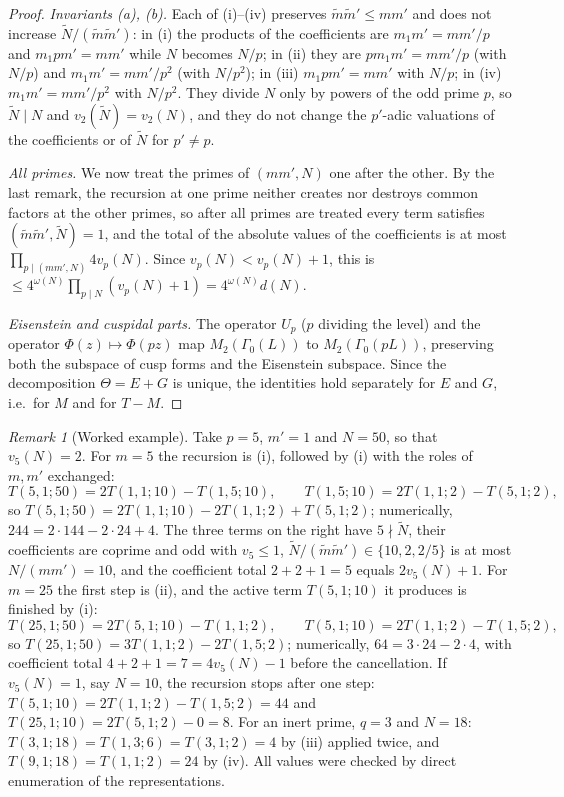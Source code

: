 \documentclass[11pt]{amsart}
\theoremstyle{remark}
\newtheorem{remark}[theorem]{Remark}
\begin{document}
\begin{proof}
\emph{Invariants (a), (b).} Each of (i)--(iv) preserves $\tilde m\tilde m'\le mm'$ and does not increase $\tilde N/(\tilde m\tilde m')$: in (i) the products of the coefficients are $m_1m'=mm'/p$ and $m_1pm'=mm'$ while $N$ becomes $N/p$; in (ii) they are $pm_1m'=mm'/p$ (with $N/p$) and $m_1m'=mm'/p^2$ (with $N/p^2$); in (iii) $m_1pm'=mm'$ with $N/p$; in (iv) $m_1m'=mm'/p^2$ with $N/p^2$. They divide $N$ only by powers of the odd prime $p$, so $\tilde N\mid N$ and $v_2(\tilde N)=v_2(N)$, and they do not change the $p'$-adic valuations of the coefficients or of $\tilde N$ for $p'\ne p$.

\emph{All primes.} We now treat the primes of $(mm',N)$ one after the other. By the last remark, the recursion at one prime neither creates nor destroys common factors at the other primes, so after all primes are treated every term satisfies $(\tilde m\tilde m',\tilde N)=1$, and the total of the absolute values of the coefficients is at most $\prod_{p\mid(mm',N)}4v_p(N)$. Since $v_p(N)<v_p(N)+1$, this is $\le4^{\omega(N)}\prod_{p\mid N}(v_p(N)+1)=4^{\omega(N)}d(N)$.

\emph{Eisenstein and cuspidal parts.} The operator $U_p$ ($p$ dividing the level) and the operator $\Phi(z)\mapsto\Phi(pz)$ map $M_2(\Gamma_0(L))$ to $M_2(\Gamma_0(pL))$, preserving both the subspace of cusp forms and the Eisenstein subspace. Since the decomposition $\Theta=E+G$ is unique, the identities hold separately for $E$ and $G$, i.e.\ for $M$ and for $T-M$.
\end{proof}

\begin{remark}[Worked example]\label{rem:example}
Take $p=5$, $m'=1$ and $N=50$, so that $v_5(N)=2$. For $m=5$ the recursion is (i), followed by (i) with the roles of $m,m'$ exchanged:
\[
T(5,1;50)=2T(1,1;10)-T(1,5;10),\qquad T(1,5;10)=2T(1,1;2)-T(5,1;2),
\]
so $T(5,1;50)=2T(1,1;10)-2T(1,1;2)+T(5,1;2)$; numerically, $244=2\cdot144-2\cdot24+4$. The three terms on the right have $5\nmid\tilde N$, their coefficients are coprime and odd with $v_5\le1$, $\tilde N/(\tilde m\tilde m')\in\{10,2,2/5\}$ is at most $N/(mm')=10$, and the coefficient total $2+2+1=5$ equals $2v_5(N)+1$. For $m=25$ the first step is (ii), and the active term $T(5,1;10)$ it produces is finished by (i):
\[
T(25,1;50)=2T(5,1;10)-T(1,1;2),\qquad T(5,1;10)=2T(1,1;2)-T(1,5;2),
\]
so $T(25,1;50)=3T(1,1;2)-2T(1,5;2)$; numerically, $64=3\cdot24-2\cdot4$, with coefficient total $4+2+1=7=4v_5(N)-1$ before the cancellation. If $v_5(N)=1$, say $N=10$, the recursion stops after one step: $T(5,1;10)=2T(1,1;2)-T(1,5;2)=44$ and $T(25,1;10)=2T(5,1;2)-0=8$. For an inert prime, $q=3$ and $N=18$: $T(3,1;18)=T(1,3;6)=T(3,1;2)=4$ by (iii) applied twice, and $T(9,1;18)=T(1,1;2)=24$ by (iv). All values were checked by direct enumeration of the representations.
\end{remark}
\end{document}
